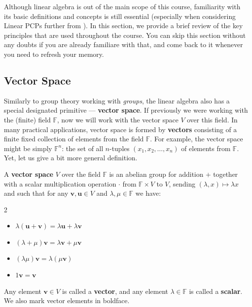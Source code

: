 \documentclass[../lecture-notes-148x210.tex]{subfiles}
\begin{document}
Although linear algebra is out of the main scope of this course, familiarity
with its basic definitions and concepts is still essential (especially when
considering Linear PCPs further from ). In this section, we
provide a brief review of the key principles that are used throughout the
course. You can skip this section without any doubts if you are already
familiare with that, and come back to it whenever you need to refresh your
memory.

\subsection{Vector Space}

Similarly to group theory working with \textit{groups}, the linear algebra also
has a special designated primitive --- \textbf{vector space}. If previously we
were working with the (finite) field $\mathbb{F}$, now we will work with the
vector space $V$ over this field. In many practical applications, vector space
is formed by \textbf{vectors} consisting of a finite fixed collection of
elements from the field $\mathbb{F}$. For example, the vector space might be
simply $\mathbb{F}^n$: the set of all $n$-tuples $(x_1,x_2,\dots,x_n)$ of
elements from $\mathbb{F}$. Yet, let us give a bit more general definition.

\begin{definition}
    A \textbf{vector space} $V$ over the field $\mathbb{F}$ is an abelian group for addition $+$ together with a scalar multiplication operation $\cdot$ from $\mathbb{F} \times V$ to $V$, sending $(\lambda,x) \mapsto \lambda x$ and such that for any $\mathbf{v},\mathbf{u} \in V$ and $\lambda,\mu \in \mathbb{F}$ we have:
    \begin{xmulticols}{2}
        \begin{itemize}
            \item $\lambda(\mathbf{u}+\mathbf{v}) = \lambda \mathbf{u} + \lambda \mathbf{v}$
            \item $(\lambda + \mu)\mathbf{v} = \lambda \mathbf{v} + \mu \mathbf{v}$
            \item $(\lambda \mu)\mathbf{v} = \lambda(\mu \mathbf{v})$
            \item $1\mathbf{v} = \mathbf{v}$
        \end{itemize}
    \end{xmulticols}

    Any element $\mathbf{v} \in V$ is called a \textbf{vector}, and any element $\lambda \in \mathbb{F}$ is called a \textbf{scalar}. We also mark vector elements in boldface.
\end{definition}
\end{document}
